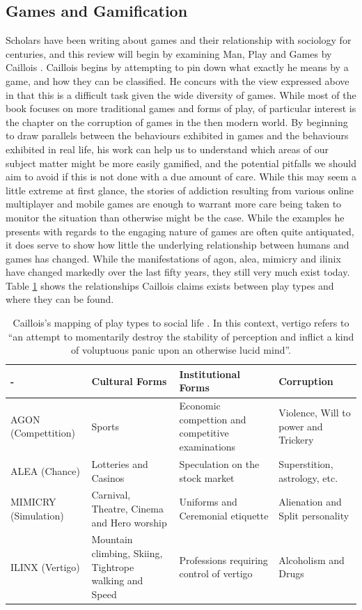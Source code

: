 \documentclass[12pt]{article}
\begin{document}
\subsection{Games and Gamification}
Scholars have been writing about games and their relationship with sociology for centuries, and this review will begin by examining Man, Play and Games by Caillois \cite{caillois1961man}. Caillois begins by attempting to pin down what exactly he means by a game, and how they can be classified. He concurs with the view expressed above in that this is a difficult task given the wide diversity of games. While most of the book focuses on more traditional games and forms of play, of particular interest is the chapter on the corruption of games in the then modern world. By beginning to draw parallels between the behaviours exhibited in games and the behaviours exhibited in real life, his work can help us to understand which areas of our subject matter might be more easily gamified, and the potential pitfalls we should aim to avoid if this is not done with a due amount of care. While this may seem a little extreme at first glance, the stories of addiction resulting from various online multiplayer and mobile games are enough to warrant more care being taken to monitor the situation than otherwise might be the case. While the examples he presents with regards to the engaging nature of games are often quite antiquated, it does serve to show how little the underlying relationship between humans and games has changed. While the manifestations of agon, alea, mimicry and ilinix have changed markedly over the last fifty years, they still very much exist today. Table \ref{table:corruption} shows the relationships Caillois claims exists between play types and where they can be found.

\begin{table}[p]
	\begin{center}
	\begin{tabular}{|p{2.0cm}|p{4.2cm}|p{4.2cm}|p{4.2cm}|}
		\hline - & Cultural Forms & Institutional Forms & Corruption \\ 
		\hline AGON (Compettition) & Sports & Economic compettion and competitive examinations & Violence, Will to power and Trickery \\ 
		\hline ALEA (Chance) & Lotteries and Casinos & Speculation on the stock market & Superstition, astrology, etc. \\ 
		\hline MIMICRY (Simulation) & Carnival, Theatre, Cinema and Hero worship & Uniforms and Ceremonial etiquette & Alienation and Split personality \\ 
		\hline ILINX (Vertigo) & Mountain climbing, Skiing, Tightrope walking and Speed & Professions requiring control of vertigo & Alcoholism and Drugs \\ 
		\hline 
	\end{tabular}
	\end{center}
	\caption{Caillois's mapping of play types to social life \cite{caillois1961man}. In this context, vertigo refers to ``an attempt to momentarily destroy the stability of perception and inflict a kind of voluptuous panic upon an otherwise lucid mind''.}
	\label{table:corruption}
\end{table}
\end{document}
